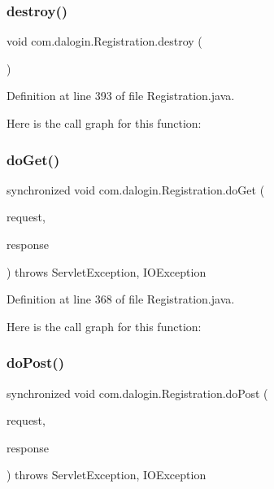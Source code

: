 \subsubsection{\texorpdfstring{destroy()}{destroy()}}
{\footnotesize\ttfamily void com.\+dalogin.\+Registration.\+destroy (\begin{DoxyParamCaption}{ }\end{DoxyParamCaption})}



Definition at line 393 of file Registration.\+java.

Here is the call graph for this function\+:
\mbox{\label{classcom_1_1dalogin_1_1_registration_ac8e25f85ec127e49f142e8694729a932}} 
\subsubsection{\texorpdfstring{do\+Get()}{doGet()}}
{\footnotesize\ttfamily synchronized void com.\+dalogin.\+Registration.\+do\+Get (\begin{DoxyParamCaption}\item[{Http\+Servlet\+Request}]{request,  }\item[{Http\+Servlet\+Response}]{response }\end{DoxyParamCaption}) throws Servlet\+Exception, I\+O\+Exception}



Definition at line 368 of file Registration.\+java.

Here is the call graph for this function\+:
\mbox{\label{classcom_1_1dalogin_1_1_registration_a148bd08226082d310ac19c2a03607408}} 
\subsubsection{\texorpdfstring{do\+Post()}{doPost()}}
{\footnotesize\ttfamily synchronized void com.\+dalogin.\+Registration.\+do\+Post (\begin{DoxyParamCaption}\item[{Http\+Servlet\+Request}]{request,  }\item[{Http\+Servlet\+Response}]{response }\end{DoxyParamCaption}) throws Servlet\+Exception, I\+O\+Exception}



